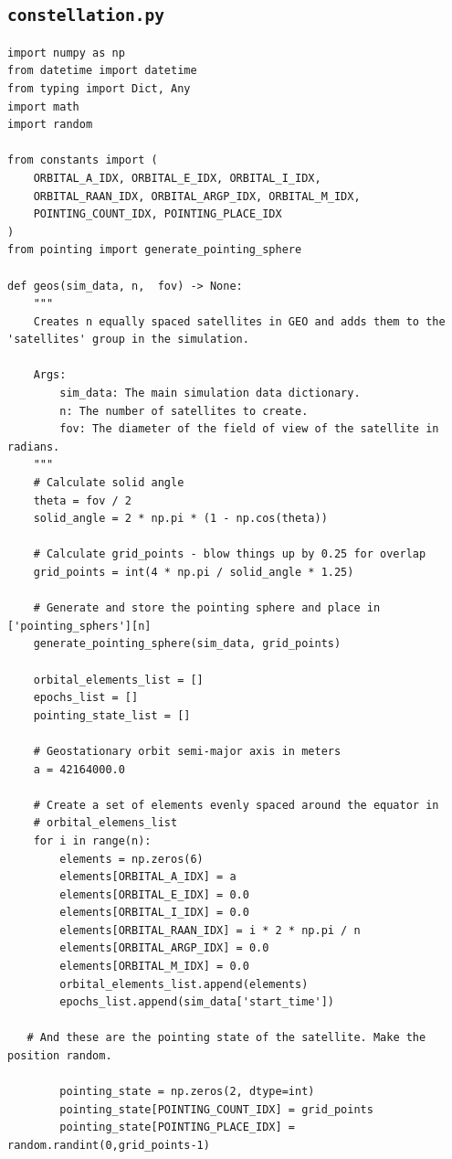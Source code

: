 \documentclass[11pt]{article}
\begin{document}
\subsection{\texttt{constellation.py}}
\begin{Verbatim}
import numpy as np
from datetime import datetime
from typing import Dict, Any
import math
import random

from constants import (
    ORBITAL_A_IDX, ORBITAL_E_IDX, ORBITAL_I_IDX,
    ORBITAL_RAAN_IDX, ORBITAL_ARGP_IDX, ORBITAL_M_IDX,
    POINTING_COUNT_IDX, POINTING_PLACE_IDX
)
from pointing import generate_pointing_sphere

def geos(sim_data, n,  fov) -> None:
    """
    Creates n equally spaced satellites in GEO and adds them to the 'satellites' group in the simulation.

    Args:
        sim_data: The main simulation data dictionary.
        n: The number of satellites to create.
        fov: The diameter of the field of view of the satellite in radians.
    """
    # Calculate solid angle
    theta = fov / 2
    solid_angle = 2 * np.pi * (1 - np.cos(theta))

    # Calculate grid_points - blow things up by 0.25 for overlap
    grid_points = int(4 * np.pi / solid_angle * 1.25)

    # Generate and store the pointing sphere and place in ['pointing_sphers'][n]
    generate_pointing_sphere(sim_data, grid_points)

    orbital_elements_list = []
    epochs_list = []
    pointing_state_list = []

    # Geostationary orbit semi-major axis in meters
    a = 42164000.0

    # Create a set of elements evenly spaced around the equator in
    # orbital_elemens_list
    for i in range(n):
        elements = np.zeros(6)
        elements[ORBITAL_A_IDX] = a
        elements[ORBITAL_E_IDX] = 0.0
        elements[ORBITAL_I_IDX] = 0.0
        elements[ORBITAL_RAAN_IDX] = i * 2 * np.pi / n
        elements[ORBITAL_ARGP_IDX] = 0.0
        elements[ORBITAL_M_IDX] = 0.0
        orbital_elements_list.append(elements)
        epochs_list.append(sim_data['start_time'])

   # And these are the pointing state of the satellite. Make the position random.

        pointing_state = np.zeros(2, dtype=int)
        pointing_state[POINTING_COUNT_IDX] = grid_points
        pointing_state[POINTING_PLACE_IDX] = random.randint(0,grid_points-1)


\end{Verbatim}
\end{document}
